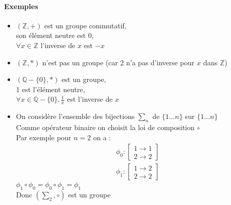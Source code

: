 \documentclass{report}
\newcommand{\Z}{\mathbb{Z}}
\newcommand{\Q}{\mathbb{Q}}
\begin{document}
	\paragraph{Exemples}
	\begin{itemize}
		\item $(\Z,+)$ est un groupe commutatif,\\
		son élément neutre est 0,\\
		$\forall x \in \Z$ l'inverse de $x$ est $-x$
		\item $(\Z,*)$ n'est pas un groupe (car 2 n'a pas d'inverse pour $x$ dans $\Z$)
		\item $(\Q-\{0\},*)$ est un groupe,\\
		1 est l'élément neutre,\\
		$\forall x \in \Q - \{0\}, \frac{1}{x}$ est l'inverse de $x$
		\item On considère l'ensemble des bijections $\sum_n$ de $\{1 \dots n\}$ sur $\{1 \dots n\}$\\
		Comme opérateur binaire on choisit la loi de composition $\circ$\\
		Par exemple pour $n=2$ on a :\\
		\[
		\begin{split}
			\phi_0 : 
			\begin{bmatrix}
			1 \to 1 \\ 2 \to 2
			\end{bmatrix}
			\\
			\phi_1 : 
			\begin{bmatrix}
			1 \to 2 \\ 2 \to 2
			\end{bmatrix}
		\end{split}
		\]
		$\phi_1 \circ \phi_0 = \phi_0 \circ \phi_1 = \phi_1$\\
		Donc $(\sum_2,\circ)$ est un groupe

\end{itemize}
\end{document}
